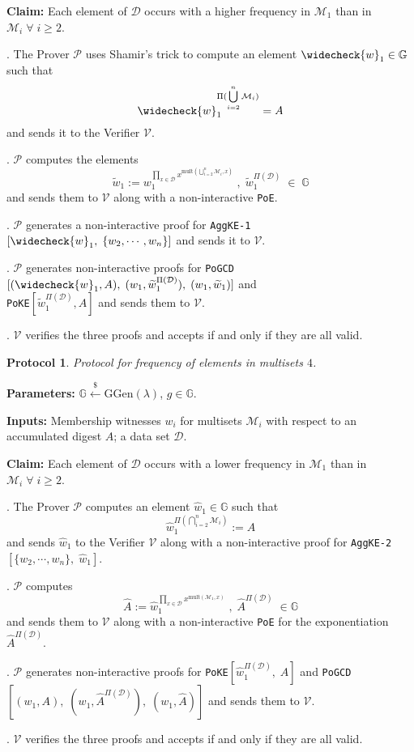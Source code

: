 \documentclass[11pt, lettersize, notitlepage, leqno, footskip=0.6cm]{article}
\newcommand{\pl}{\prod\limits}
\newcommand{\wti}{\widetilde}
\newcommand{\mc}{\mathcal}
\newcommand{\mb}{\mathbb}
\newcommand{\mr}{\mathrm}
\newcommand{\lamb}{\lambda}
\newcommand{\what}{\widehat}
\newcommand{\weck}{\widecheck}
\newcommand{\mP}{\mc{P}}
\newcommand{\V}{\mc{V}}
\newcommand{\vs}{\vspace{-0.15cm}}
\newcommand{\noin}{\noindent}
\newcommand{\nons}{non-interactive proofs}
\newtheorem{Prot}[Thm]{Protocol}
\numberwithin{equation}{section}
\begin{document}
\noin \textbf{Claim:} Each element of $\mc{D}$ occurs with a higher frequency in $\mc{M}_1$ than in $\mc{M}_i\;\forall\;i\geq 2$.

\begin{prf1}\noin {}. The Prover $\mP$ uses Shamir's trick to compute an element $\weck{w}_1\in \mb{G}$ such that \vs $$\weck{w}_1 ^{\Pi(\bigcup\limits_{i=2}^n \mc{M}_i)} = A $$ and sends it to the Verifier $\V$.

\noin 2. $\mP$ computes the elements \vs $$\wti{w}_1:= w_1^{\pl_{x\in\mc{D}} x^{\mr{mult}(\bigcup\limits_{i=2}^n \mc{M}_i, x)}}\;,\; \wti{w}_1^{\Pi(\mc{D})}\;\in\;\mb{G}$$ and sends them to $\V$ along with a non-interactive \verb|PoE|.

\noin 3. $\mP$ generates a non-interactive proof for \verb|AggKE-1|$[\weck{w}_1,\;\{w_2,\cdots,w_n\}]$ and sends it to $\V$. 

\noin 4. $\mP$ generates non-interactive proofs for \verb|PoGCD|$[(\weck{w}_1, A),\;(w_1,\wti{w}_1^{\Pi(\mc{D})}),\;(w_1,\wti{w}_1)]$ and\\ \verb|PoKE|$[\wti{w}_1^{\Pi(\mc{D})},A]$ and sends them to $\V$.

\noin 5. $\V$ verifies the three proofs and accepts if and only if they are all valid.\end{prf1}



\begin{Prot} Protocol for frequency of elements in multisets $4$.\end{Prot} \vspace{-0.3cm}

\noin \textbf{Parameters:} $\mb{G}\xleftarrow{\$} \mr{GGen}(\lamb)$,\; $g\in \mb{G}$.

\noin \textbf{Inputs:} Membership witnesses $w_i$ for multisets $\mc{M}_i$ with respect to an accumulated digest $A$; a data set $\mc{D}$.

\noin \textbf{Claim:} Each element of $\mc{D}$ occurs with a lower frequency in $\mc{M}_1$ than in $\mc{M}_i\;\forall\;i\geq 2$.

\begin{prf1}\noin {}. The Prover $\mP$ computes an element $\what{w}_1\in\mb{G}$ such that \vs $$\what{w}_1^{\Pi(\bigcap\limits_{i=2}^n \mc{M}_i)}:= A$$ and sends $\what{w}_1$ to the Verifier $\V$ along with a non-interactive proof for \verb|AggKE-2|$[\{w_2,\cdots,w_n\},\;\what{w}_1]$.

\noin 2. $\mP$ computes \vs $$\what{A}:= \what{w}_1^{\pl_{x\in\mc{D}}x^{\mr{mult}(\mc{M}_1,x)}}\;,\;\what{A}^{\Pi(\mc{D})}\;\in\mb{G}$$ and sends them to $\V$ along with a non-interactive \verb|PoE| for the exponentiation $\what{A}^{\Pi(\mc{D})}$.

\noin 3. $\mP$ generates \nons\; for \verb|PoKE|$[\what{w}_1^{\Pi(\mc{D})},\;A]$ and \verb|PoGCD|$[(w_1,A),\;(w_1, \what{A}^{\Pi(\mc{D})}),\;(w_1, \what{A})]$ and sends them to $\V$.

\noin 4. $\V$ verifies the three proofs and accepts if and only if they are all valid.\end{prf1}
\end{document}

